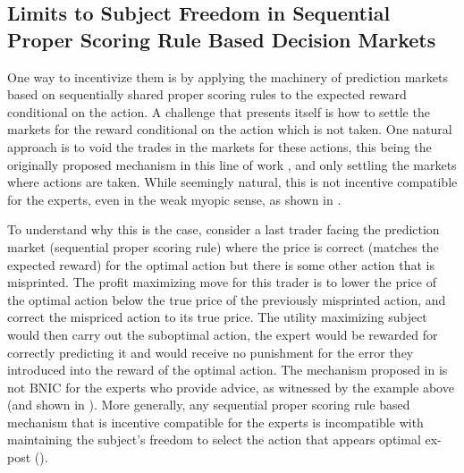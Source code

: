 \subsection{Limits to Subject Freedom in Sequential Proper Scoring Rule Based Decision Markets}

One way to incentivize them is by applying the machinery of prediction markets based on sequentially shared proper scoring rules to the expected reward conditional on the action.
A challenge that presents itself is how to settle the markets for the reward conditional on the action which is not taken.
One natural approach is to void the trades in the markets for these actions, this being the originally proposed mechanism in this line of work \cite{hanson2002decision}, and only settling the markets where actions are taken.
While seemingly natural, this is not incentive compatible for the experts, even in the weak myopic sense, as shown in \cite{othman2010decision}. 

To understand why this is the case, consider a last trader facing the prediction market (sequential proper scoring rule)  where the  price is correct (matches the expected reward) for the optimal action but there is some other action that is misprinted. The profit maximizing move for this trader is to lower the price of the optimal action below the true price of the previously misprinted action, and correct the mispriced action to its true  price. 
The utility maximizing subject would then carry out the suboptimal action, the expert would be rewarded for correctly predicting it and would receive no punishment for the error they introduced into the reward of the optimal action. 
The mechanism proposed in \cite{hanson2002decision} is not BNIC for the experts who provide advice, as witnessed by the example above (and shown in \cite{othman2010decision,chen2014eliciting}).
More generally, any sequential proper scoring rule based mechanism that is incentive compatible for the experts is incompatible with maintaining the subject's freedom to select the action that appears optimal ex-post (\cite{ chen2014eliciting}). 




